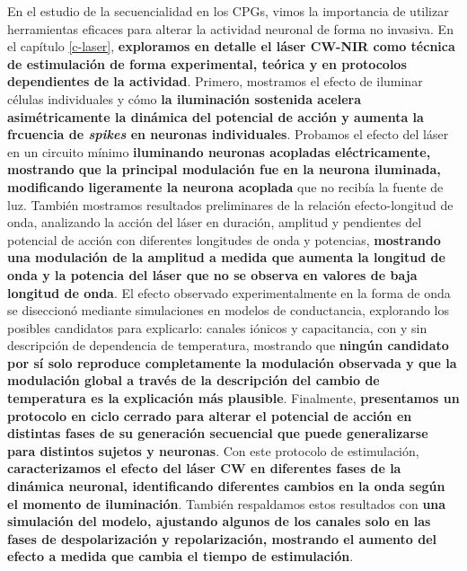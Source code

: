 En el estudio de la secuencialidad en los CPGs, vimos la importancia de utilizar herramientas eficaces para alterar la actividad neuronal de forma no invasiva. En el capítulo \ref{c-laser}, \textbf{exploramos en detalle el láser CW-NIR como técnica de estimulación de forma experimental, teórica y en protocolos dependientes de la actividad}. Primero, mostramos el efecto de iluminar células individuales y cómo \textbf{la iluminación sostenida acelera asimétricamente la dinámica del potencial de acción y aumenta la frcuencia de  \textit{spikes} en neuronas individuales}. Probamos el efecto del láser en un circuito mínimo \textbf{iluminando neuronas acopladas eléctricamente, mostrando que la principal modulación fue en la neurona iluminada, modificando ligeramente la neurona acoplada} que no recibía la fuente de luz. También mostramos resultados preliminares de la relación efecto-longitud de onda, analizando la acción del láser en duración, amplitud y pendientes del potencial de acción con diferentes longitudes de onda y potencias, \textbf{mostrando una modulación de la amplitud a medida que aumenta la longitud de onda y la potencia del láser que no se observa en valores de baja longitud de onda}. El efecto observado experimentalmente en la forma de onda se diseccionó mediante simulaciones en modelos de conductancia, explorando los posibles candidatos para explicarlo: canales iónicos y capacitancia, con y sin descripción de dependencia de temperatura, mostrando que \textbf{ningún candidato por sí solo reproduce completamente la modulación observada y que la modulación global a través de la descripción del cambio de temperatura es la explicación más plausible}. Finalmente, \textbf{presentamos un protocolo en ciclo cerrado para alterar el potencial de acción en distintas fases de su generación secuencial que puede generalizarse para distintos sujetos y neuronas}. Con este protocolo de estimulación, \textbf{caracterizamos el efecto del láser CW en diferentes fases de la dinámica neuronal, identificando diferentes cambios en la onda según el momento de iluminación}. También respaldamos estos resultados con \textbf{una simulación del modelo, ajustando algunos de los canales solo en las fases de despolarización y repolarización, mostrando el aumento del efecto a medida que cambia el tiempo de estimulación}.

